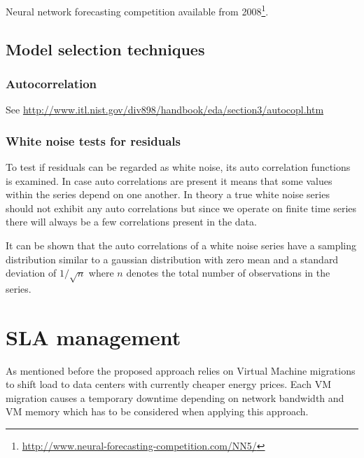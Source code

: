Neural network forecasting competition available from 2008\footnote{\url{http://www.neural-forecasting-competition.com/NN5/}}. 




\subsection{Model selection techniques}


\subsubsection{Autocorrelation}



See \url{http://www.itl.nist.gov/div898/handbook/eda/section3/autocopl.htm}


\subsubsection{White noise tests for residuals}

To test if residuals can be regarded as white noise, its auto correlation functions is examined. In case auto correlations are present it means that some values within the series depend on one another. In theory a true white noise series should not exhibit any auto correlations but since we operate on finite time series there will always be a few correlations present in the data\cite{makridakisforecasting}. 

It can be shown that the auto correlations of a white noise series have a sampling distribution similar to a gaussian distribution with zero mean and a standard deviation of $1/\sqrt{n}$ where $n$ denotes the total number of observations in the series\cite{makridakisforecasting}. 






\section{SLA management}

As mentioned before the proposed approach relies on Virtual Machine migrations to shift load to data centers with currently cheaper energy prices. Each VM migration causes a temporary downtime depending on network bandwidth and VM memory \cite{liu2013performance} which has to be considered when applying this approach. 


